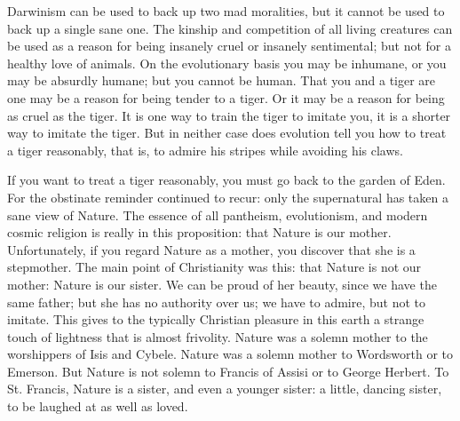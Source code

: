 \documentclass{book}
\begin{document}
Darwinism can be used to back up two mad moralities, but it cannot be used to back up a single sane one. The kinship and competition of all living creatures can be used as a reason for being insanely cruel or insanely sentimental; but not for a healthy love of animals. On the evolutionary basis you may be inhumane, or you may be absurdly humane; but you cannot be human. That you and a tiger are one may be a reason for being tender to a tiger. Or it may be a reason for being as cruel as the tiger. It is one way to train the tiger to imitate you, it is a shorter way to imitate the tiger. But in neither case does evolution tell you how to treat a tiger reasonably, that is, to admire his stripes while avoiding his claws.

If you want to treat a tiger reasonably, you must go back to the garden of Eden. For the obstinate reminder continued to recur: only the supernatural has taken a sane view of Nature. The essence of all pantheism, evolutionism, and modern cosmic religion is really in this proposition: that Nature is our mother. Unfortunately, if you regard Nature as a mother, you discover that she is a stepmother. The main point of Christianity was this: that Nature is not our mother: Nature is our sister. We can be proud of her beauty, since we have the same father; but she has no authority over us; we have to admire, but not to imitate. This gives to the typically Christian pleasure in this earth a strange touch of lightness that is almost frivolity. Nature was a solemn mother to the worshippers of Isis and Cybele. Nature was a solemn mother to Wordsworth or to Emerson. But Nature is not solemn to Francis of Assisi or to George Herbert. To St. Francis, Nature is a sister, and even a younger sister: a little, dancing sister, to be laughed at as well as loved.
\end{document}
